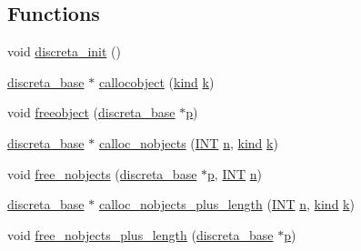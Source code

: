 \subsection*{Functions}
\begin{DoxyCompactItemize}
\item 
void \mbox{\hyperlink{global_8_c_a26c1fcfc028f99baaccd7da37c8688e7}{discreta\+\_\+init}} ()
\item 
\mbox{\hyperlink{classdiscreta__base}{discreta\+\_\+base}} $\ast$ \mbox{\hyperlink{global_8_c_a8bbcb8338d159223714097d10e94364d}{callocobject}} (\mbox{\hyperlink{discreta_8h_aaf25ee7e2306d78c74ec7bc48f092e81}{kind}} \mbox{\hyperlink{simeon_8_c_a43fa990200c3ddd47c35f151bd4d66bf}{k}})
\item 
void \mbox{\hyperlink{global_8_c_a3bd8a0c7f8d0451709f6e310536ff2ae}{freeobject}} (\mbox{\hyperlink{classdiscreta__base}{discreta\+\_\+base}} $\ast$\mbox{\hyperlink{alphabet2_8_c_a533391314665d6bf1b5575e9a9cd8552}{p}})
\item 
\mbox{\hyperlink{classdiscreta__base}{discreta\+\_\+base}} $\ast$ \mbox{\hyperlink{global_8_c_ac4f2f2cc6ba6e81f619b82209b46f9ae}{calloc\+\_\+nobjects}} (\mbox{\hyperlink{galois_8h_a09fddde158a3a20bd2dcadb609de11dc}{I\+NT}} \mbox{\hyperlink{simeon_8_c_a7f2cd26777ce0ff3fdaf8d02aacbddfb}{n}}, \mbox{\hyperlink{discreta_8h_aaf25ee7e2306d78c74ec7bc48f092e81}{kind}} \mbox{\hyperlink{simeon_8_c_a43fa990200c3ddd47c35f151bd4d66bf}{k}})
\item 
void \mbox{\hyperlink{global_8_c_a611c9c0d818da1013bd6c369124a8fa6}{free\+\_\+nobjects}} (\mbox{\hyperlink{classdiscreta__base}{discreta\+\_\+base}} $\ast$\mbox{\hyperlink{alphabet2_8_c_a533391314665d6bf1b5575e9a9cd8552}{p}}, \mbox{\hyperlink{galois_8h_a09fddde158a3a20bd2dcadb609de11dc}{I\+NT}} \mbox{\hyperlink{simeon_8_c_a7f2cd26777ce0ff3fdaf8d02aacbddfb}{n}})
\item 
\mbox{\hyperlink{classdiscreta__base}{discreta\+\_\+base}} $\ast$ \mbox{\hyperlink{global_8_c_a71599d54c8c17dfa065a363f5cdd0aa4}{calloc\+\_\+nobjects\+\_\+plus\+\_\+length}} (\mbox{\hyperlink{galois_8h_a09fddde158a3a20bd2dcadb609de11dc}{I\+NT}} \mbox{\hyperlink{simeon_8_c_a7f2cd26777ce0ff3fdaf8d02aacbddfb}{n}}, \mbox{\hyperlink{discreta_8h_aaf25ee7e2306d78c74ec7bc48f092e81}{kind}} \mbox{\hyperlink{simeon_8_c_a43fa990200c3ddd47c35f151bd4d66bf}{k}})
\item 
void \mbox{\hyperlink{global_8_c_a9fe9986097b58d1ade2867be95632efb}{free\+\_\+nobjects\+\_\+plus\+\_\+length}} (\mbox{\hyperlink{classdiscreta__base}{discreta\+\_\+base}} $\ast$\mbox{\hyperlink{alphabet2_8_c_a533391314665d6bf1b5575e9a9cd8552}{p}})

\end{DoxyCompactItemize}
